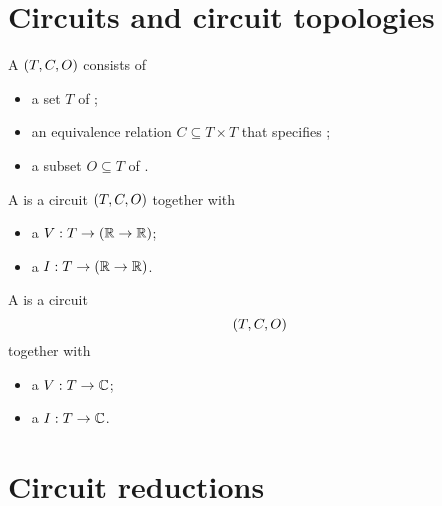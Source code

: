 \chapter{Circuits and circuit topologies}
\begin{definition}
A  $\sSet{T,C,O}$ consists of
\begin{itemize}
\item a set $T$ of ;
\item an equivalence relation $C\subseteq T\times T$ that specifies ;
\item a subset $O \subseteq T$ of .
\end{itemize}

A  is a circuit $\sSet{T,C,O}$ together with
\begin{itemize}
\item a  $V: T \to (\mathbb{R}\to \mathbb{R})$;
\item a  $I: T \to (\mathbb{R}\to \mathbb{R})$.
\end{itemize} 
A  is a circuit $$\sSet{T,C,O}$$ together with 
\begin{itemize}
\item a  $V: T \to \mathbb{C}$;
\item a  $I: T \to \mathbb{C}$.
\end{itemize} 
\end{definition}

\chapter{Circuit reductions}